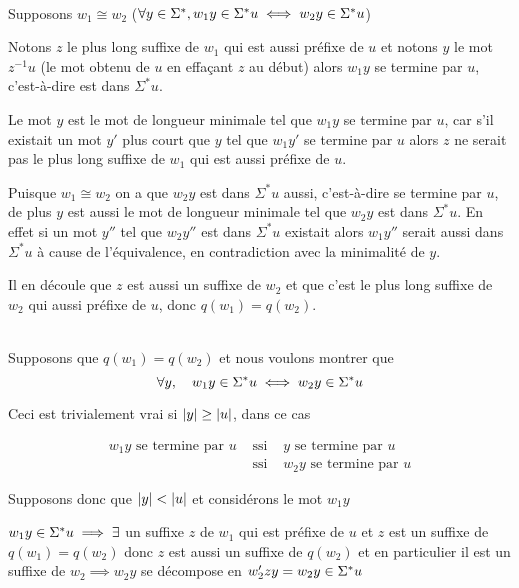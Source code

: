 \begin{proofI}
	\item \bimpLR \\
	Supposons $w_1 \cong w_2$ ($\forall y \in \Sigma^{*}, w_1y \in \Sigma^{*} u \iff w_2y\in \Sigma^{*} u$)

	Notons $z$ le plus long suffixe de $w_1$ qui est aussi préfixe de  $u$ et notons $y$ le mot $z^{-1}u$ (le mot obtenu de $u$ en effaçant $z$ au début)
	alors $w_1y$ se termine par $u$, c'est-à-dire est  dans $\Sigma^*u$.


	Le mot $y$ est le mot de longueur minimale tel que $w_1y$ se termine par $u$, car s'il existait un mot $y'$ plus court que $y$  tel que $w_1y'$
	se termine par $u$ alors $z$ ne serait pas le plus long suffixe de $w_1$ qui est aussi préfixe de $u$.


	Puisque $w_1 \cong  w_2$ on a que   $w_2y$  est  dans $\Sigma^*u$ aussi, c'est-à-dire  se termine par $u$, de plus  $y$ est aussi le mot de
	longueur minimale  tel que $w_2y$  est  dans $\Sigma^*u$. En effet  si un mot $y''$ tel que $w_2y''$  est  dans $\Sigma^*u$  existait alors
	$w_1 y''$ serait aussi dans $\Sigma^*u$  à cause de l'équivalence, en contradiction avec la minimalité de $y$.


	Il en découle que $z$ est aussi un suffixe de $w_2$ et que c'est le plus long suffixe de $w_2$ qui aussi préfixe de $u$, donc $q(w_1)=q(w_2)$.

	\item \bimpRL \\
	Supposons que $q(w_1) = q(w_2)$ et nous voulons montrer que
	$$\forall y, \quad w_1 y \in \Sigma^{*} u \iff w_2 y \in \Sigma^{*} u$$

	Ceci est trivialement vrai si $|y| \geq |u|$,
	dans ce cas

	\begin{eqnarray*}
		w_1 y \text{ se termine par } u & \text{ ssi }& y \text{ se termine par } u \\
		& \text{ ssi }& w_2y \text{ se termine par } u
	\end{eqnarray*}

	Supposons donc que $|y| < |u|$ et considérons le mot $w_1 y$

	$w_1y \in \Sigma^{*} u \implies \exists$ un suffixe $z$ de $w_1$ qui est préfixe de $u$ et $z$ est un suffixe de $q(w_1) = q(w_2)$
	donc $z$ est aussi un suffixe de $q(w_2)$ et en particulier il est un suffixe de $w_2 \implies w_2 y $ se décompose en
	$w_2'zy = w_2 y \in \Sigma^{*} u$
\end{proofI}

